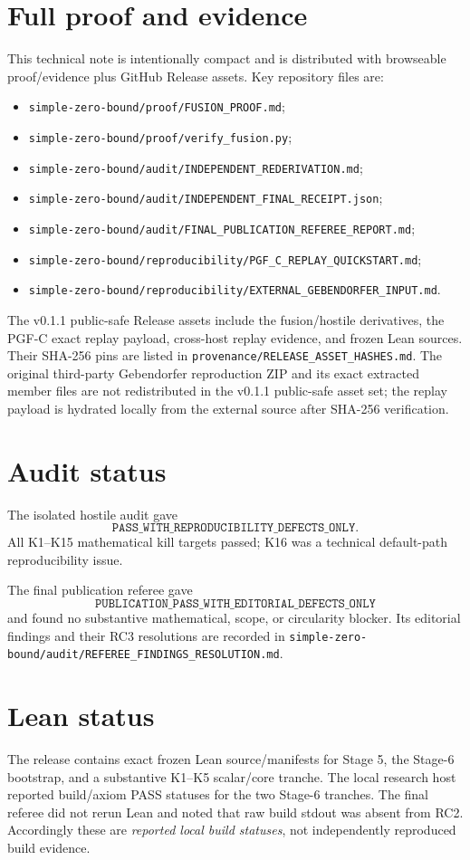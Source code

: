 \documentclass[11pt]{article}
\begin{document}
\section{Full proof and evidence}
This technical note is intentionally compact and is distributed with browseable proof/evidence plus GitHub Release assets. Key repository files are:
\begin{itemize}
\item \nolinkurl{simple-zero-bound/proof/FUSION_PROOF.md};
\item \nolinkurl{simple-zero-bound/proof/verify_fusion.py};
\item \nolinkurl{simple-zero-bound/audit/INDEPENDENT_REDERIVATION.md};
\item \nolinkurl{simple-zero-bound/audit/INDEPENDENT_FINAL_RECEIPT.json};
\item \nolinkurl{simple-zero-bound/audit/FINAL_PUBLICATION_REFEREE_REPORT.md};
\item \nolinkurl{simple-zero-bound/reproducibility/PGF_C_REPLAY_QUICKSTART.md};
\item \nolinkurl{simple-zero-bound/reproducibility/EXTERNAL_GEBENDORFER_INPUT.md}.
\end{itemize}
The v0.1.1 public-safe Release assets include the fusion/hostile derivatives, the PGF-C exact replay payload, cross-host replay evidence, and frozen Lean sources. Their SHA-256 pins are listed in \texttt{provenance/RELEASE\_ASSET\_HASHES.md}. The original third-party Gebendorfer reproduction ZIP and its exact extracted member files are not redistributed in the v0.1.1 public-safe asset set; the replay payload is hydrated locally from the external source after SHA-256 verification.

\section{Audit status}
The isolated hostile audit gave
\[
\texttt{PASS\_WITH\_REPRODUCIBILITY\_DEFECTS\_ONLY}.
\]
All K1--K15 mathematical kill targets passed; K16 was a technical default-path reproducibility issue.

The final publication referee gave
\[
\texttt{PUBLICATION\_PASS\_WITH\_EDITORIAL\_DEFECTS\_ONLY}
\]
and found no substantive mathematical, scope, or circularity blocker. Its editorial findings
and their RC3 resolutions are recorded in \nolinkurl{simple-zero-bound/audit/REFEREE_FINDINGS_RESOLUTION.md}.

\section{Lean status}
The release contains exact frozen Lean source/manifests for Stage 5, the Stage-6 bootstrap,
and a substantive K1--K5 scalar/core tranche. The local research host reported build/axiom PASS
statuses for the two Stage-6 tranches. The final referee did not rerun Lean and noted that raw
build stdout was absent from RC2. Accordingly these are \emph{reported local build statuses},
not independently reproduced build evidence.
\end{document}
